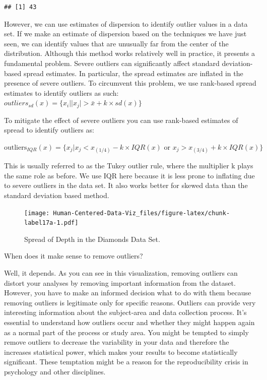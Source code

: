 \documentclass[
]{book}
\begin{document}
\begin{verbatim}
## [1] 43
\end{verbatim}

However, we can use estimates of dispersion to identify outlier values in a data set. If we make an estimate of dispersion based on the techniques we have just seen, we can identify values that are unusually far from the center of the distribution. Although this method works relatively well in practice, it presents a fundamental problem. Severe outliers can significantly affect standard deviation-based spread estimates. In particular, the spread estimates are inflated in the presence of severe outliers. To circumvent this problem, we use rank-based spread estimates to identify outliers as such:
\(outliers_{sd}(x)= \{x_i||x_j|>\bar{x}+k \times sd(x)\}\)

To mitigate the effect of severe outliers you can use rank-based estimates of spread to identify outliers as:

\(\mbox{outliers}_{IQR}(x)= \{x_j|x_j < x_{(1/4)} - k \times IQR(x) \mbox{ or } x_j > x_{(3/4)} + k \times IQR(x) \}\)

This is usually referred to as the Tukey outlier rule, where the multiplier k plays the same role as before. We use IQR here because it is less prone to inflating due to severe outliers in the data set. It also works better for skewed data than the standard deviation based method.

\begin{figure}
\centering
\texttt{[image: Human-Centered-Data-Viz\_files/figure-latex/chunk-label17a-1.pdf]}
\caption{\label{fig:chunk-label17a}Spread of Depth in the Diamonds Data Set.}
\end{figure}

When does it make sense to remove outliers?

Well, it depends. As you can see in this visualization, removing outliers can distort your analyses by removing important information from the dataset. However, you have to make an informed decision what to do with them because removing outliers is legitimate only for specific reasons. Outliers can provide very interesting information about the subject-area and data collection process. It's essential to understand how outliers occur and whether they might happen again as a normal part of the process or study area. You might be tempted to simply remove outliers to decrease the variability in your data and therefore the increases statistical power, which makes your results to become statistically significant. These temptation might be a reason for the reproducibility crisis in psychology and other disciplines.
\end{document}
